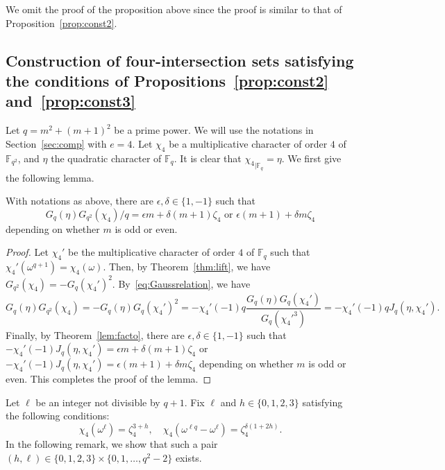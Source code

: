 \documentclass[ALCO,ThmDefs,Unicode]{cedram}
\newcommand*\F{{\mathbb F}}
\begin{document}
We omit the proof of the proposition above since the proof is similar to that of Proposition~\ref{prop:const2}.

\subsection{Construction of four-intersection sets satisfying the conditions of Propositions~\ref{prop:const2} and~\ref{prop:const3}}\label{sec:5.2}

Let $q=m^2+(m+1)^2$ be a prime power. We will use the notations in Section~\ref{sec:comp} with $e=4$. Let $\chi_4$ be a multiplicative character of order $4$ of $\F_{q^2}$, and $\eta$ the quadratic character of $\F_{q}$. It is clear that ${\chi_4}_{|\F_q}=\eta$. We first give the following lemma.

\begin{lemm}\label{lem:Gaussconst}
With notations as above, there are $\epsilon,\delta\in \{1,-1\}$ such that
\[
G_q(\eta)G_{q^2}(\chi_4)/q=\epsilon m+\delta (m+1)\zeta_4 \mbox{ or } \epsilon (m+1)+\delta m \zeta_4
\]
depending on whether $m$ is odd or even.
\end{lemm}

\begin{proof}
Let $\chi_4'$ be the multiplicative character of order $4$ of $\F_q$ such that $\chi_4'(\omega^{q+1})=\chi_4(\omega)$. Then, by Theorem~\ref{thm:lift}, we have $ G_{q^2}(\chi_4)=-G_q(\chi_4')^2$. By~\eqref{eq:Gaussrelation}, we have
\[
G_q(\eta)G_{q^2}(\chi_4)=-G_q(\eta)G_{q}(\chi_4')^2=-\chi_4'(-1)q\frac{G_q(\eta)G_{q}(\chi_4')}{G_{q}(\chi_4'^3)}= -\chi_4'(-1)qJ_q(\eta,\chi_4').
\]
Finally, by Theorem~\ref{lem:facto}, there are $\epsilon,\delta\in \{1,-1\}$ such that $-\chi_4'(-1)J_q(\eta,\chi_4')=\epsilon m+\delta (m+1)\zeta_4$ or $-\chi_4'(-1)J_q(\eta,\chi_4')=\epsilon (m+1)+\delta m \zeta_4$ depending on whether $m$ is odd or even. This completes the proof of the lemma.
\end{proof}

Let $\ell$ be an integer not divisible by $q+1$. Fix $\ell$ and $h\in \{0,1,2,3\}$ satisfying the following conditions:
\begin{equation}\label{eq:cond24RR}
\chi_4(\omega^{\ell})=\zeta_4^{3+h}, \quad
\chi_4(\omega^{\ell q}-\omega^{\ell})=\zeta_4^{\delta (1+2h)}.
\end{equation}
In the following remark, we show that such a pair $(h,\ell)\in \{0,1,2,3\}\times \{0,1,\ldots,q^2-2\}$ exists.
\end{document}
